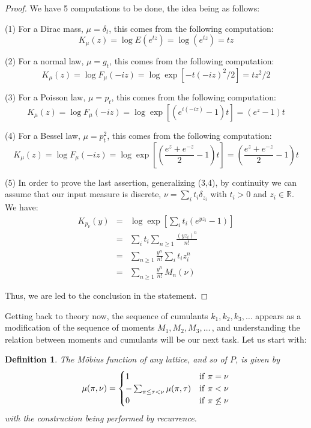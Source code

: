 \documentclass[12pt]{amsbook}
\newtheorem{definition}[theorem]{Definition}
\begin{document}
\begin{proof}
We have 5 computations to be done, the idea being as follows:

\medskip

(1) For a Dirac mass, $\mu=\delta_t$, this comes from the following computation:
$$K_\mu(z)
=\log E(e^{tz})
=\log(e^{tz})
=tz$$

(2) For a normal law, $\mu=g_t$, this comes from the following computation:
$$K_\mu(z)
=\log F_\mu(-iz)
=\log\exp\left[-t(-iz)^2/2\right]
=tz^2/2$$

(3) For a Poisson law, $\mu=p_t$, this comes from the following computation:
$$K_\mu(z)
=\log F_\mu(-iz)
=\log\exp\left[(e^{i(-iz)}-1)t\right]
=(e^z-1)t$$

(4) For a Bessel law, $\mu=p_t^2$, this comes from the following computation:
$$K_\mu(z)
=\log F_\mu(-iz)
=\log\exp\left[\left(\frac{e^z+e^{-z}}{2}-1\right)t\right]
=\left(\frac{e^z+e^{-z}}{2}-1\right)t$$

(5) In order to prove the last assertion, generalizing (3,4), by continuity we can assume that our input measure is discrete, $\nu=\sum_i t_i\delta_{z_i}$ with $t_i>0$ and $z_i\in\mathbb R$. We have:
\begin{eqnarray*}
K_{p_\nu}(y)
&=&\log\exp\left[\sum_it_i(e^{yz_i}-1)\right]\\
&=&\sum_it_i\sum_{n\geq1}\frac{(yz_i)^n}{n!}\\
&=&\sum_{n\geq1}\frac{y^n}{n!}\sum_it_iz_i^n\\
&=&\sum_{n\geq1}\frac{y^n}{n!}\,M_n(\nu)
\end{eqnarray*}

Thus, we are led to the conclusion in the statement.
\end{proof}

Getting back to theory now, the sequence of cumulants $k_1,k_2,k_3,\ldots$ appears as a modification of the sequence of moments $M_1,M_2,M_3,\ldots\,$, and understanding the relation between moments and cumulants will be our next task. Let us start with:


\begin{definition}
The M\"obius function of any lattice, and so of $P$, is given by
$$\mu(\pi,\nu)=\begin{cases}
1&{\rm if}\ \pi=\nu\\
-\sum_{\pi\leq\tau<\nu}\mu(\pi,\tau)&{\rm if}\ \pi<\nu\\
0&{\rm if}\ \pi\not\leq\nu
\end{cases}$$
with the construction being performed by recurrence.
\end{definition}
\end{document}
